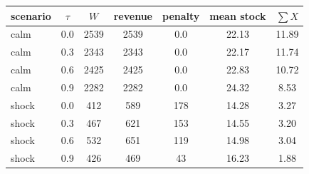 \begin{center}
\small
{}
\label{tab:welfare}
\begin{tabular}{lcccccc}
\toprule
scenario & \(\tau\) & \(W\) & revenue & penalty & mean stock & \(\sum X\) \\
\midrule
calm & 0.0 & 2539 & 2539 & 0.0 & 22.13 & 11.89 \\
calm & 0.3 & 2343 & 2343 & 0.0 & 22.17 & 11.74 \\
calm & 0.6 & 2425 & 2425 & 0.0 & 22.83 & 10.72 \\
calm & 0.9 & 2282 & 2282 & 0.0 & 24.32 & 8.53 \\
shock & 0.0 & 412 & 589 & 178 & 14.28 & 3.27 \\
shock & 0.3 & 467 & 621 & 153 & 14.55 & 3.20 \\
shock & 0.6 & 532 & 651 & 119 & 14.98 & 3.04 \\
shock & 0.9 & 426 & 469 & 43 & 16.23 & 1.88 \\
\bottomrule
\end{tabular}
\end{center}
\vspace{0.6em}
